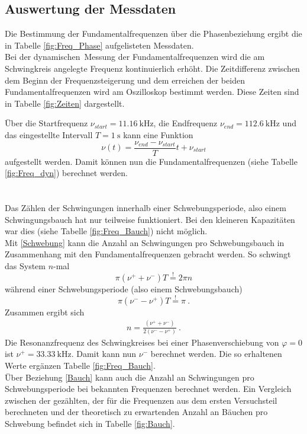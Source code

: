 \subsection{Auswertung der Messdaten}
Die Bestimmung der Fundamentalfrequenzen über die Phasenbeziehung ergibt die in Tabelle \ref{fig:Freq_Phase} aufgelisteten Messdaten.
 \\
Bei der \glqq dynamischen\grqq\ Messung der Fundamentalfrequenzen wird die am Schwingkreis angelegte Frequenz kontinuierlich erhöht. Die Zeitdifferenz zwischen dem Beginn der Frequenzsteigerung und dem erreichen der beiden Fundamentalfrequenzen wird am Oszilloskop bestimmt werden. Diese Zeiten sind in Tabelle \ref{fig:Zeiten} dargestellt.

Über die Startfrequenz $\nu_{start} = \SI{11.16}{\kilo\hertz}$, die Endfrequenz $\nu_{end} = \SI{112.6}{\kilo\hertz}$ und das eingestellte Intervall $T = \SI{1}{\second}$ kann eine Funktion
\[ \nu(t) = \frac{\nu_{end}-\nu_{start}}{T}t+\nu_{start} \]
aufgestellt werden. Damit können nun die Fundamentalfrequenzen (siehe Tabelle \ref{fig:Freq_dyn}) berechnet werden. \\

\ \\
\ \\
Das Zählen der Schwingungen innerhalb einer Schwebungsperiode, also einem Schwingungsbauch hat nur teilweise funktioniert. Bei den kleineren Kapazitäten war dies (siehe Tabelle \ref{fig:Freq_Bauch}) nicht möglich. \\
Mit \eqref{Schwebung} kann die Anzahl an Schwingungen pro Schwebungsbauch in Zusammenhang mit den Fundamentalfrequenzen gebracht werden. So schwingt das System $n$-mal
\[ \pi(\nu^+ + \nu^-)T \overset{!}{=} 2\pi n \]
während einer Schwebungsperiode (also einem Schwebungsbauch)
\[ \pi(\nu^- - \nu^+)T \overset{!}{=} \pi \ . \]
Zusammen ergibt sich
\begin{align}\label{Bauch}
	n = \frac{(\nu^+ + \nu^-)}{2(\nu^- - \nu^+)} \ .
\end{align}
Die Resonanzfrequenz des Schwingkreises bei einer Phasenverschiebung von $\varphi=0$ ist $\nu^+=\SI{33.33}{\kilo\hertz}$. Damit kann nun $\nu^-$ berechnet werden. Die so erhaltenen Werte ergänzen Tabelle \ref{fig:Freq_Bauch}.
 \\
Über Beziehung \eqref{Bauch} kann auch die Anzahl an Schwingungen pro Schwebungsperiode bei bekannten Frequenzen berechnet werden. Ein Vergleich zwischen der gezählten, der für die Frequenzen aus dem ersten Versuchsteil berechneten und der theoretisch zu erwartenden Anzahl an Bäuchen pro Schwebung befindet sich in Tabelle \ref{fig:Bauch}.